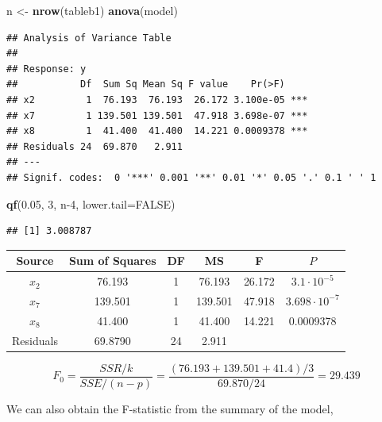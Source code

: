 \documentclass[
  11pt,
]{article}
\newenvironment{Shaded}{\begin{snugshade}}{\end{snugshade}}
\newcommand{\AttributeTok}[1]{\textcolor[rgb]{0.13,0.29,0.53}{#1}}
\newcommand{\ConstantTok}[1]{\textcolor[rgb]{0.56,0.35,0.01}{#1}}
\newcommand{\DecValTok}[1]{\textcolor[rgb]{0.00,0.00,0.81}{#1}}
\newcommand{\FloatTok}[1]{\textcolor[rgb]{0.00,0.00,0.81}{#1}}
\newcommand{\FunctionTok}[1]{\textcolor[rgb]{0.13,0.29,0.53}{\textbf{#1}}}
\newcommand{\NormalTok}[1]{#1}
\newcommand{\OtherTok}[1]{\textcolor[rgb]{0.56,0.35,0.01}{#1}}
\begin{document}
\begin{Shaded}
\begin{Highlighting}[]
\NormalTok{n }\OtherTok{\textless{}{-}} \FunctionTok{nrow}\NormalTok{(tableb1)}
\FunctionTok{anova}\NormalTok{(model)}
\end{Highlighting}
\end{Shaded}

\begin{verbatim}
## Analysis of Variance Table
## 
## Response: y
##           Df  Sum Sq Mean Sq F value    Pr(>F)    
## x2         1  76.193  76.193  26.172 3.100e-05 ***
## x7         1 139.501 139.501  47.918 3.698e-07 ***
## x8         1  41.400  41.400  14.221 0.0009378 ***
## Residuals 24  69.870   2.911                      
## ---
## Signif. codes:  0 '***' 0.001 '**' 0.01 '*' 0.05 '.' 0.1 ' ' 1
\end{verbatim}

\begin{Shaded}
\begin{Highlighting}[]
\FunctionTok{qf}\NormalTok{(}\FloatTok{0.05}\NormalTok{, }\DecValTok{3}\NormalTok{, n}\DecValTok{{-}4}\NormalTok{, }\AttributeTok{lower.tail=}\ConstantTok{FALSE}\NormalTok{)}
\end{Highlighting}
\end{Shaded}

\begin{verbatim}
## [1] 3.008787
\end{verbatim}

\begin{center}
  \begin{tabular}{|c|c|c|c|c|c|}
      \hline
      Source & Sum of Squares & DF & MS & F & $P$ \\ 
      \hline
      $x_2$ & 76.193 & 1 & 76.193 &26.172  &$3.1 \cdot 10^{-5}$ \\
      $x_7$ & 139.501 & 1 & 139.501 & 47.918 & $3.698 \cdot 10^{-7}$ \\
      $x_8$ & 41.400 & 1 & 41.400 & 14.221 & 0.0009378\\
      Residuals & 69.8790 & 24 & 2.911 & & \\
      \hline
  \end{tabular}
\end{center}

\[F_0 = \frac{SSR/k}{SSE/(n-p)} = \frac{(76.193 + 139.501 + 41.4)/3}{69.870/24} = 29.439\]

We can also obtain the F-statistic from the summary of the model,
\end{document}
